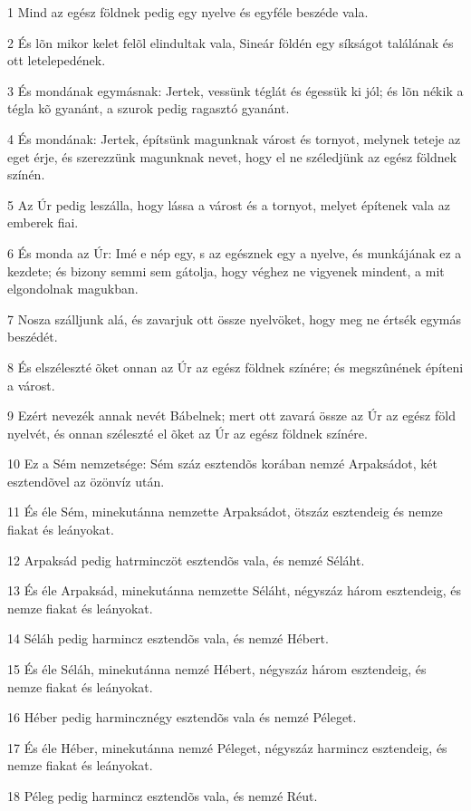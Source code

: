 \par 1 Mind az egész földnek pedig egy nyelve és egyféle beszéde vala.
\par 2 És lõn mikor kelet felõl elindultak vala, Sineár földén egy síkságot találának és ott letelepedének.
\par 3 És mondának egymásnak: Jertek, vessünk téglát és égessük ki jól; és lõn nékik a tégla kõ gyanánt, a szurok pedig ragasztó gyanánt.
\par 4 És mondának: Jertek, építsünk magunknak várost és tornyot, melynek teteje az eget érje, és szerezzünk magunknak nevet, hogy el ne széledjünk az egész földnek színén.
\par 5 Az Úr pedig leszálla, hogy lássa a várost és a tornyot, melyet építenek vala az emberek fiai.
\par 6 És monda az Úr: Imé e nép egy, s az egésznek egy a nyelve, és munkájának ez a kezdete; és bizony semmi sem gátolja, hogy véghez ne vigyenek mindent, a mit elgondolnak magukban.
\par 7 Nosza szálljunk alá, és zavarjuk ott össze nyelvöket, hogy meg ne értsék egymás beszédét.
\par 8 És elszéleszté õket onnan az Úr az egész földnek színére; és megszûnének építeni a várost.
\par 9 Ezért nevezék annak nevét Bábelnek; mert ott zavará össze az Úr az egész föld nyelvét, és onnan széleszté el õket az Úr az egész földnek színére.
\par 10 Ez a Sém nemzetsége: Sém száz esztendõs korában nemzé Arpaksádot, két esztendõvel az özönvíz után.
\par 11 És éle Sém, minekutánna nemzette Arpaksádot, ötszáz esztendeig és nemze fiakat és leányokat.
\par 12 Arpaksád pedig hatrminczöt esztendõs vala, és nemzé Séláht.
\par 13 És éle Arpaksád, minekutánna nemzette Séláht, négyszáz három esztendeig, és nemze fiakat és leányokat.
\par 14 Séláh pedig harmincz esztendõs vala, és nemzé Hébert.
\par 15 És éle Séláh, minekutánna nemzé Hébert, négyszáz három esztendeig, és nemze fiakat és leányokat.
\par 16 Héber pedig harmincznégy esztendõs vala és nemzé Péleget.
\par 17 És éle Héber, minekutánna nemzé Péleget, négyszáz harmincz esztendeig, és nemze fiakat és leányokat.
\par 18 Péleg pedig harmincz esztendõs vala, és nemzé Réut.
